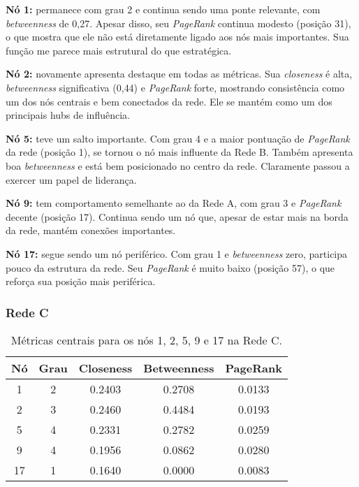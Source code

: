 \documentclass[a4paper]{article}
\begin{document}
\textbf{Nó 1:} permanece com grau 2 e continua sendo uma ponte relevante, com \textit{betweenness} de 0{,}27. Apesar disso, seu \textit{PageRank} continua modesto (posição 31), o que mostra que ele não está diretamente ligado aos nós mais importantes. Sua função me parece mais estrutural do que estratégica.

\textbf{Nó 2:} novamente apresenta destaque em todas as métricas. Sua \textit{closeness} é alta, \textit{betweenness} significativa (0{,}44) e \textit{PageRank} forte, mostrando consistência como um dos nós centrais e bem conectados da rede. Ele se mantém como um dos principais hubs de influência.

\textbf{Nó 5:} teve um salto importante. Com grau 4 e a maior pontuação de \textit{PageRank} da rede (posição 1), se tornou o nó mais influente da Rede B. Também apresenta boa \textit{betweenness} e está bem posicionado no centro da rede. Claramente passou a exercer um papel de liderança.

\textbf{Nó 9:} tem comportamento semelhante ao da Rede A, com grau 3 e \textit{PageRank} decente (posição 17). Continua sendo um nó que, apesar de estar mais na borda da rede, mantém conexões importantes.

\textbf{Nó 17:} segue sendo um nó periférico. Com grau 1 e \textit{betweenness} zero, participa pouco da estrutura da rede. Seu \textit{PageRank} é muito baixo (posição 57), o que reforça sua posição mais periférica.


\subsubsection{Rede C}

\begin{table}[h]
\centering
\begin{tabular}{|c|c|c|c|c|}
\hline
\textbf{Nó} & \textbf{Grau} & \textbf{Closeness} & \textbf{Betweenness} & \textbf{PageRank} \\
\hline
1  & 2 & 0.2403 & 0.2708 & 0.0133 \\
2  & 3 & 0.2460 & 0.4484 & 0.0193 \\
5  & 4 & 0.2331 & 0.2782 & 0.0259 \\
9  & 4 & 0.1956 & 0.0862 & 0.0280 \\
17 & 1 & 0.1640 & 0.0000 & 0.0083 \\
\hline
\end{tabular}
\caption{Métricas centrais para os nós 1, 2, 5, 9 e 17 na Rede C.}
\end{table}
\end{document}
